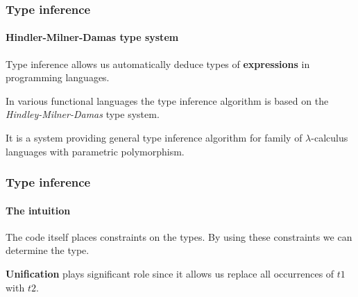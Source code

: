 \documentclass{beamer}
\newcommand{\vpad}{\vspace{5pt}}
\newcommand{\vPad}{\vspace{10pt}}
\begin{document}
\begin{frame} \frametitle{Type inference}
  \framesubtitle{Hindler-Milner-Damas type system}
  Type inference allows us automatically deduce types of \textbf{expressions} in programming languages.

  \vPad
  In various functional languages the type inference algorithm is based on the \textit{Hindley-Milner-Damas}
  type system.

  \vpad
  It is a system providing general type inference algorithm for family of $\lambda$-calculus languages
  with parametric polymorphism.
\end{frame}

\begin{frame} \frametitle{Type inference}
  \framesubtitle{The intuition}
  The code itself places constraints on the types. By using these constraints we can determine the type.

  \vpad
  \textbf{Unification} plays significant role since it allows us replace all occurrences of $t1$ with $t2$.
\end{frame}




\end{document}
